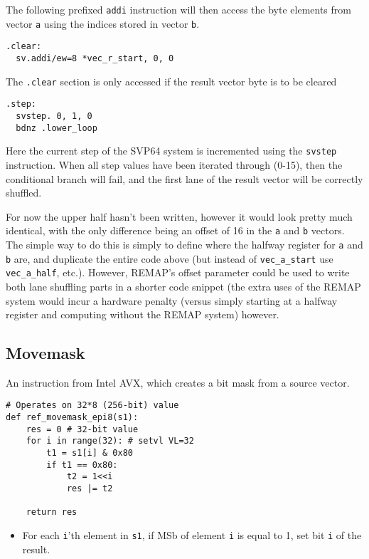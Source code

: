 The following prefixed \texttt{addi} instruction will then access the byte
elements from vector \texttt{a} using the indices stored in vector \texttt{b}.

\begin{verbatim}
.clear:
  sv.addi/ew=8 *vec_r_start, 0, 0
\end{verbatim}

The \texttt{.clear} section is only accessed if the result vector byte is to be cleared

\begin{verbatim}
.step:
  svstep. 0, 1, 0
  bdnz .lower_loop
\end{verbatim}

Here the current step of the \acrshort{SVP64} system is incremented using the
\texttt{svstep} instruction. When all step values have been iterated through
(0-15), then the conditional branch will fail, and the first lane of the result
vector will be correctly shuffled.

For now the upper half hasn't been written, however it would look pretty much
identical, with the only difference being an offset of 16 in the \texttt{a}
and \texttt{b} vectors. The simple way to do this is simply to define where
the halfway register for \texttt{a} and \texttt{b} are, and duplicate
the entire code above (but instead of \texttt{vec\_a\_start} use
\texttt{vec\_a\_half}, etc.).
However, REMAP's offset parameter could be used to write
both lane shuffling parts in a shorter code snippet (the extra uses of the
REMAP system would incur a hardware penalty (versus simply starting at a
halfway register and computing without the REMAP system) however.

\subsection{Movemask}

An instruction from Intel \acrshort{AVX}, which creates a bit mask from a
source vector.

\begin{verbatim}
# Operates on 32*8 (256-bit) value
def ref_movemask_epi8(s1):
    res = 0 # 32-bit value
    for i in range(32): # setvl VL=32
        t1 = s1[i] & 0x80
        if t1 == 0x80:
            t2 = 1<<i
            res |= t2

    return res
\end{verbatim}

\begin{itemize}
  \item For each \texttt{i}'th element in \texttt{s1}, if \acrshort{MSb} of
        element \texttt{i} is equal to 1, set bit \texttt{i} of the result.
\end{itemize}

